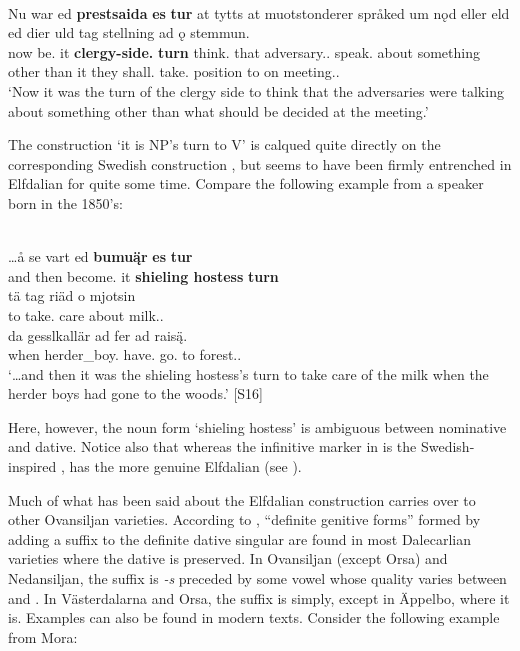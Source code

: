 \ea\label{}
\\
\gll Nu  war  ed  \textbf{prestsaida} \textbf{es} \textbf{tur} at  tytts at  muotstonderer  språked  um  nǫd  eller  eld  ed dier  uld  tag  stellning  ad  ǫ  stemmun.\\
now  be.{\pst}  it  \textbf{clergy-side.{}} \textbf{{\poss}} \textbf{turn} {\infm}  think.{\inf} that  adversary.{}.{\pl}  speak.{\pst}  about  something  other  than  it they  shall.{\pst}  take.{\inf} position  to  on  meeting.{}.{\dat}\\
\glt ‘Now it was the turn of the clergy side to think that the adversaries were talking about something other than what should be decided at the meeting.’ 
\z

The construction  ‘it is NP’s turn to V’ is calqued quite directly on the corresponding Swedish construction , but seems to have been firmly entrenched in Elfdalian for quite some time. Compare the following example from a speaker born in the 1850’s:

\ea\label{}
\\
\gll …å  se  vart  ed  \textbf{bumuą̈r} \textbf{es} \textbf{tur}\\
and  then  become.{\pst}  it  \textbf{shieling hostess} \textbf{{\poss}} \textbf{turn}\\
\gll tä  tag  riäd   o  mjotsin\\
to  take.{\inf} care  about  milk.{}.{\dat}\\
\gll da  gesslkallär  ad  fer  ad  raisą̈.\\
when  herder\_boy.{\pl}  have.{\pst}  go.{\supp}  to  forest.{}.{\dat}\\
\glt ‘…and then it was the shieling hostess’s turn to take care of the milk when the herder boys had gone to the woods.’ [S16]
\z

Here, however, the noun form  ‘shieling hostess’ is ambiguous between nominative and dative. Notice also that whereas the infinitive marker in  is the Swedish-inspired ,  has the more genuine Elfdalian  (see ). 

Much of what has been said about the Elfdalian construction carries over to other Ovansiljan varieties. According to \citet[170]{Levander1928}, “definite genitive forms” formed by adding a suffix to the definite dative singular are found in most Dalecarlian varieties where the dative is preserved. In Ovansiljan (except Orsa) and Nedansiljan, the suffix is\textit{ {}-s} preceded by some vowel whose quality varies between  and . In Västerdalarna and Orsa, the suffix is simply, except in Äppelbo, where it is. Examples can also be found in modern texts. Consider the following example from Mora:


